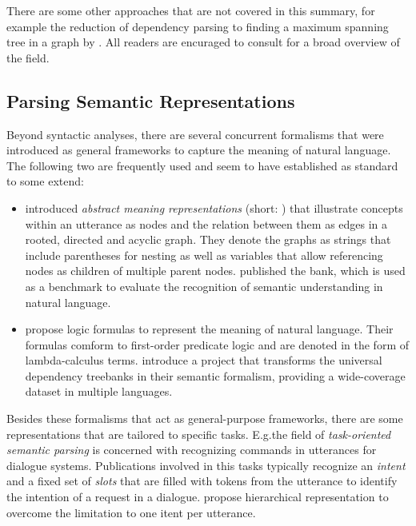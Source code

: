 \documentclass[../document.tex]{subfiles}
\begin{document}
    There are some other approaches that are not covered in this summary, for example the reduction of dependency parsing to finding a maximum spanning tree in a graph by \citet{mcdonald-etal-2005-non}.
    All readers are encuraged to consult \citet{nivre2010dependency} for a broad overview of the field.

    \subsection{Parsing Semantic Representations}
    Beyond syntactic analyses, there are several concurrent formalisms that were introduced as general frameworks to capture the meaning of natural language.
    The following two are frequently used and seem to have established as standard to some extend:
    \begin{itemize}
        \item \citet{langkilde-knight-1998-generation} introduced \emph{abstract meaning representations} (short: ) that illustrate concepts within an utterance as nodes and the relation between them as edges in a rooted, directed and acyclic graph. They denote the graphs as strings that include parentheses for nesting as well as variables that allow referencing nodes as children of multiple parent nodes. \citet{knight2021abstract} published the  bank, which is used as a benchmark to evaluate the recognition of semantic understanding in natural language.
        \item \citet{reddy-etal-2016-transforming} propose logic formulas to represent the meaning of natural language. Their formulas comform to first-order predicate logic and are denoted in the form of lambda-calculus terms. \citet{reddy-etal-2017-universal} introduce a project that transforms the universal dependency treebanks in their semantic formalism, providing a wide-coverage dataset in multiple languages.
    \end{itemize}
    Besides these formalisms that act as general-purpose frameworks, there are some representations that are tailored to specific tasks.
    E.g.\@ the field of \emph{task-oriented semantic parsing} is concerned with recognizing commands in utterances for dialogue systems.
    Publications involved in this tasks typically recognize an \emph{intent} and a fixed set of \emph{slots} that are filled with tokens from the utterance to identify the intention of a request in a dialogue.
    \citet{gupta-etal-2018-semantic-parsing} propose hierarchical representation to overcome the limitation to one itent per utterance.
\end{document}

